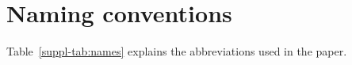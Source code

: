 \documentclass{bmcart}
\def\ta{Timed Automaton}
\def\tas{Timed Automata}
\begin{document}
\makeatother




\thispagestyle{empty}
\tableofcontents
\clearpage

\setcounter{page}{1}
\setcounter{section}{0}

\renewcommand\figurename{Figure}
\renewcommand*\thefigure{S\arabic{figure}}
\renewcommand*\thetable{S\arabic{table}}

\def\ta{TA}
\def\tas{TA}




\clearpage
\section*{Naming conventions}\label{suppl-sec:names}
Table~\ref{suppl-tab:names} explains the abbreviations used in the paper.
\end{document}
